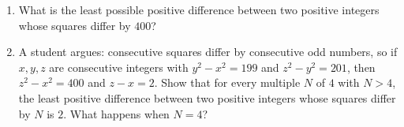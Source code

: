 \begin{enumerate}
\item[(a)] What is the least possible positive difference between two positive integers whose squares differ by $400$?
\item[(b)] A student argues: consecutive squares differ by consecutive odd numbers, so if $x,y,z$ are consecutive integers with $y^2-x^2=199$ and $z^2-y^2=201$, then $z^2-x^2=400$ and $z-x=2$. Show that for every multiple $N$ of $4$ with $N>4$, the least positive difference between two positive integers whose squares differ by $N$ is $2$. What happens when $N=4$?
\end{enumerate}
